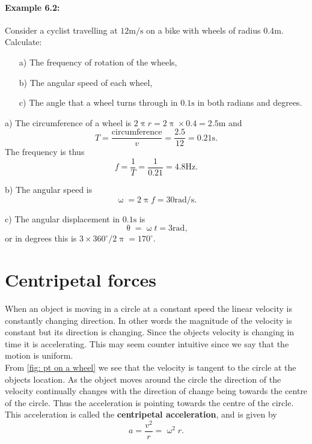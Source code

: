 \documentclass[a4paper,12pt]{book}
\begin{document}
\paragraph{Example 6.2:} Consider a cyclist travelling at $ 12\text{m/s}$ on a bike with wheels of radius $0.4\text{m}$. Calculate:
\begin{itemize}
\setlength{\itemsep}{-5pt}
    \item[a)] The frequency of rotation of the wheels,
    \item[b)] The angular speed of each wheel,
    \item[c)] The angle that a wheel turns through in $0.1\text{s}$ in both radians and degrees.
\end{itemize} 

a) The circumference of a wheel is $2\uppi r=2\uppi\times 0.4 =2.5\text{m}$ and 
\begin{equation*}
T=\frac{\text{circumference}}{v}=\frac{2.5}{12}=0.21\text{s}.
\end{equation*}
The frequency is thus
\begin{equation*}
f=\frac{1}{T}=\frac{1}{0.21}=4.8\text{Hz}.
\end{equation*}

b) The angular speed is 
\begin{equation*}
\upomega=2\uppi f=30\text{rad/s}.
\end{equation*}

c) The angular displacement in $0.1\text{s}$ is
\begin{equation*}
\uptheta=\upomega t=3 \text{rad},
\end{equation*}
or in degrees this is $3\times360^{\circ}/2\uppi=170^{\circ}$.

\section{Centripetal forces}
When an object is moving in a circle at a constant speed the linear velocity is constantly changing direction. In other words the magnitude of the velocity is constant but its direction is changing. Since the objects velocity is changing in time it is accelerating. This may seem counter intuitive since we say that the motion is uniform. \\

From \cref{fig: pt on a wheel}  we see that the velocity is tangent to the circle at the objects location. As the object moves around the circle the direction of the velocity continually changes with the direction of change being towards the centre of the circle. Thus the acceleration is pointing towards the centre of the circle. This acceleration is called the \textbf{centripetal acceleration}, and is given by
\begin{equation}
a=\frac{v^{2}}{r}=\upomega^{2}r.
\label{eq: centripetal acceleration}
\end{equation}
\end{document}
